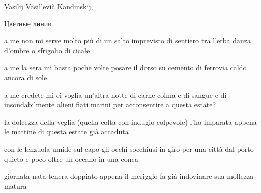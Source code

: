 \clearpage


\begin{artItem}
	Vasilij Vasil'evič Kandinskij, \begin{otherlanguage}{russian}%
		Цветные линии%
	\end{otherlanguage}
\end{artItem}

\begin{poem}
	\begin{stanza}
		a me\verseline
		non mi serve molto più di un salto\verseline
		imprevisto di sentiero tra l'erba\verseline
		danza d'ombre o sfrigolio di cicale
	\end{stanza}

	\begin{stanza}
		a me\verseline
		la sera mi basta poche volte\verseline
		posare il dorso su cemento di ferrovia\verseline
		caldo ancora di sole
	\end{stanza}

	\begin{stanza}
		a me\verseline
		credete mi ci voglia un'altra notte\verseline
		di carne colma e di sangue\verseline
		e di insondabilmente alieni fiati marini\verseline
		per acconsentire a questa estate?
	\end{stanza}
\end{poem}

\clearpage


\begin{poem}
	\begin{stanza}
		la dolcezza della veglia\verseline
		(quella colta con indugio colpevole)\verseline
		l'ho imparata appena le mattine\verseline
		di questa estate già accaduta
	\end{stanza}

	\begin{stanza}
		con le lenzuola umide sul capo\verseline
		gli occhi socchiusi\verseline
		in giro per una città dal porto quieto\verseline
		e poco oltre un oceano in una conca
	\end{stanza}
\end{poem}

\clearpage


\begin{poem}
	\begin{stanza}
		giornata nata tenera\verseline
		doppiato appena il meriggio\verseline
		fa già indovinare sua mollezza matura
	\end{stanza}
\end{poem}

